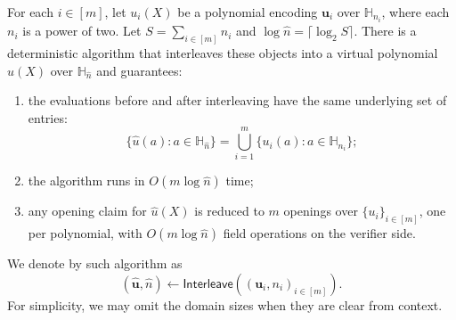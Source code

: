 \begin{lemma}[Interleaving]
\label{lem:interleaving}
For each $i\in[m]$, let
$u_i(X)$ be a polynomial encoding $\mathbf{u}_i$
over $\mathbb{H}_{n_i}$, where each
$n_i$ is a power of two. Let $S=\sum_{i\in [m]} n_i$ and
$\log\widehat{n}=\lceil \log_2 S\rceil$. There is a deterministic algorithm that
interleaves these objects into a virtual polynomial $\widehat{u}(X)$ over
$\mathbb{H}_{\widehat{n}}$ and guarantees:
\begin{enumerate}
  \item the evaluations before and after interleaving have the same underlying
  set of entries:
  \[
  \{\widehat{u}(a):a\in\mathbb{H}_{\widehat{n}}\}
  =
  \bigcup_{i=1}^m \{u_i(a):a\in\mathbb{H}_{n_i}\};
  \]
  \item the algorithm runs in $O(m\log \widehat{n})$ time;
  \item any opening claim for $\widehat{u}(X)$ is reduced to
  $m$ openings over $\{u_i\}_{i\in [m]}$, one per polynomial,
  with $O(m\log \widehat{n})$ field operations on the verifier side.
\end{enumerate}
We denote by such algorithm as 
\[ (\widehat{\mathbf{u}}, \widehat{n}) \gets \mathsf{Interleave}((\mathbf{u}_i, n_i)_{i\in [m]}).\]
For simplicity, we may omit the domain sizes when they are clear from context.
\end{lemma}

